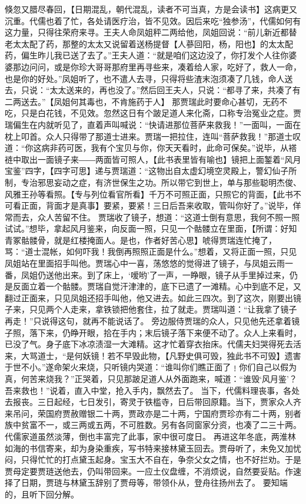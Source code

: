 \documentclass[12pt,oneside]{book}
\begin{document}
倏忽又腊尽春回，【日期混乱，朝代混乱，读者不可当真，方是会读书】这病更又沉重。代儒也着了忙，各处请医疗治，皆不见效。因后来吃“独参汤”，代儒如何有这力量，只得往荣府来寻。王夫人命凤姐秤二两给他，凤姐回说：“前儿新近都替老太太配了药，那整的太太又说留着送杨提督【人蔘回阳，杨，阳也】的太太配药，偏生昨儿我已送了去了。”王夫人道：“就是咱们这边没了，你打发个人往你婆婆那边问问，或是你珍大哥哥那府里再寻些来，凑着给人家，吃好了，救人一命，也是你的好处。”凤姐听了，也不遣人去寻，只得将些渣末泡须凑了几钱，命人送去，只说：“太太送来的，再也没了。”然后回王夫人，只说：“都寻了来，共凑了有二两送去。”【凤姐何其毒也，不肯施药于人】
那贾瑞此时要命心甚切，无药不吃，只是白花钱，不见效。忽然这日有个跛足道人来化斋，口称专治冤业之症。贾瑞偏生在内就听见了，直着声叫喊说：“快请进那位菩萨来救我！”一面叫，一面在枕上叩首。众人只得带了那道士进来。贾瑞一把拉住，连叫“菩萨救我！”那道士叹道：“你这病非药可医，我有个宝贝与你，你天天看时，此命可保矣。”说毕，从褡裢中取出一面镜子来――两面皆可照人，【此书表里皆有喻也】镜把上面錾着“风月宝鉴”四字，【四字可思】递与贾瑞道：“这物出自太虚幻境空灵殿上，警幻仙子所制，专治邪思妄动之症，有济世保生之功。所以带它到世上，单与那些聪明杰俊、风雅王孙等看照。【专与列位看官所看】千万不可照正面，只照它的背面，【此书不可看正面，背面才是真事】要紧，要紧！三日后吾来收取，管叫你好了。”说毕，佯常而去，众人苦留不住。
贾瑞收了镜子，想道：“这道士倒有意思，我何不照一照试试。”想毕，拿起风月鉴来，向反面一照，只见一个骷髅立在里面，【所谓：好知青冢骷髅骨，就是红楼掩面人。是也，作者好苦心思】唬得贾瑞连忙掩了，骂：“道士混帐，如何吓我！我倒再照照正面是什么。”想着，又将正面一照，只见凤姐站在里面招手叫他。贾瑞心中一喜，荡悠悠的觉得进了镜子，与凤姐云雨一番，凤姐仍送他出来。到了床上，‘嗳哟’了一声，一睁眼，镜子从手里掉过来，仍是反面立着一个骷髅。贾瑞自觉汗津津的，底下已遗了一滩精。心中到底不足，又翻过正面来，只见凤姐还招手叫他，他又进去。如此三四次。到了这次，刚要出镜子来，只见两个人走来，拿铁锁把他套住，拉了就走。贾瑞叫道：“让我拿了镜子再走！”只说得这句，就再不能说话了。
旁边服侍贾瑞的众人，只见他先还拿着镜子照，落下来，仍睁开眼，拾在手内；末后镜子落下来便不动了。众人上来看时，已没了气。身子底下冰凉渍湿一大滩精。这才忙着穿衣抬床。代儒夫妇哭得死去活来，大骂道士，“是何妖镜！若不早毁此物，【凡野史俱可毁，独此书不可毁】遗害于世不小。”遂命架火来烧，只听镜内哭道：“谁叫你们瞧正面了﹗你们自己以假为真，何苦来烧我？”正哭着，只见那跛足道人从外面跑来，喊道：“谁毁‘风月鉴’？吾来救也！”说着，直入中堂，抢入手内，飘然去了。
当下，代儒料理丧事，各处去报丧。三日起经，七日发引，寄灵于铁槛寺，日后带回原籍。当下，贾家众人齐来吊问，荣国府贾赦赠银二十两，贾政亦是二十两，宁国府贾珍亦有二十两，别者族中贫富不一，或三两或五两，不可胜数。另有各同窗家分资，也凑了二三十两。代儒家道虽然淡薄，倒也丰富完了此事，家中很可度日。
再进这年冬底，两淮林如海的书信寄来，却为身染重疾，写书特来接林黛玉回去。贾母听了，未免又加忧闷，只得忙忙的打点黛玉起身。宝玉大不自在，争奈父女之情，也不好拦劝。于是贾母定要贾琏送他去，仍叫带回来。一应土仪盘缠，不消烦说，自然要妥贴。作速择了日期，贾琏与林黛玉辞别了贾母等，带领仆从，登舟往扬州去了。
要知端的，且听下回分解。
\end{document}
